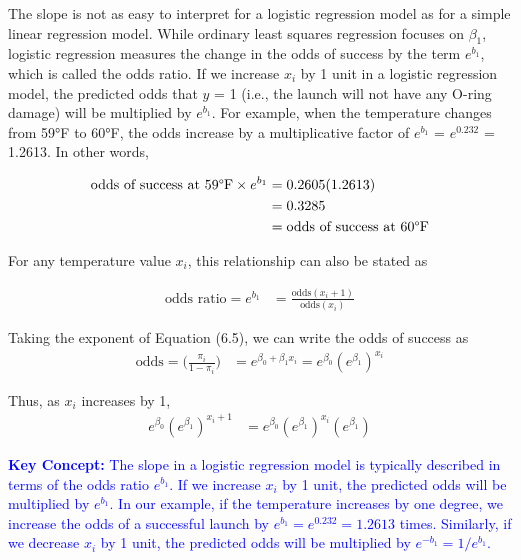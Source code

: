 \documentclass[
]{report}
\begin{document}
The slope is not as easy to interpret for a logistic regression model as for a simple linear regression model. While ordinary least squares regression focuses on \(\scriptstyle \beta_1\), logistic regression measures the change in the odds of success by the term \(\scriptstyle e^{b_1}\), which is called the odds ratio. If we increase \(\scriptstyle x_i\) by 1 unit in a logistic regression model, the predicted odds that \(\scriptstyle y\) = 1 (i.e., the launch will not have any O-ring damage) will be multiplied by \(\scriptstyle e^{b_1}\). For example, when the temperature changes from 59°F to 60°F, the odds increase by a multiplicative factor of \(\scriptstyle e^{b_1}\) = \(\scriptstyle e^{0.232}\) = 1.2613. In other words,

\begin{align}
\text{odds of success at 59°F} \times e^{b_1} 
&= 0.2605(1.2613) \notag \\
&= 0.3285 \notag \\
&= \text{odds of success at 60°F} \notag
\end{align}

For any temperature value \(\scriptstyle x_i\), this relationship can also be stated as

\begin{align}
\text{odds ratio} = e^{b_1} &= \frac{\text{odds}(x_i + 1)}{\text{odds}(x_i)} \tag{6.10}
\end{align}

Taking the exponent of Equation (6.5), we can write the odds of success as
\begin{align}
\text{odds} = \biggl(\frac{\pi_i}{1 - \pi_i}\biggr) &= e^{\beta_0 + \beta_1 x_i} = e^{\beta_0}(e^{\beta_1})^{x_i} 
\tag{6.11}
\end{align}

Thus, as \(\scriptstyle x_i\) increases by 1,
\begin{align}
e^{\beta_0}(e^{\beta_1})^{x_i + 1} &= e^{\beta_0}(e^{\beta_1})^{x_i}(e^{\beta_1}) \tag{6.12}
\end{align}

\textbf{\textcolor{blue}{Key Concept:}} \textcolor{blue}{The slope in a logistic regression model is typically described in terms of the odds ratio $\scriptstyle e^{b_1}$. If we increase $\scriptstyle x_i$ by 1 unit, the predicted odds will be multiplied by $\scriptstyle e^{b_1}$. In our example, if the temperature increases by one degree, we increase the odds of a successful launch by $\scriptstyle e^{b_1} = e^{0.232} = 1.2613$ times. Similarly, if we decrease $\scriptstyle x_i$ by 1 unit, the predicted odds will be multiplied by $\scriptstyle e^{-b_1} = 1/e^{b_1}$.}
\end{document}
